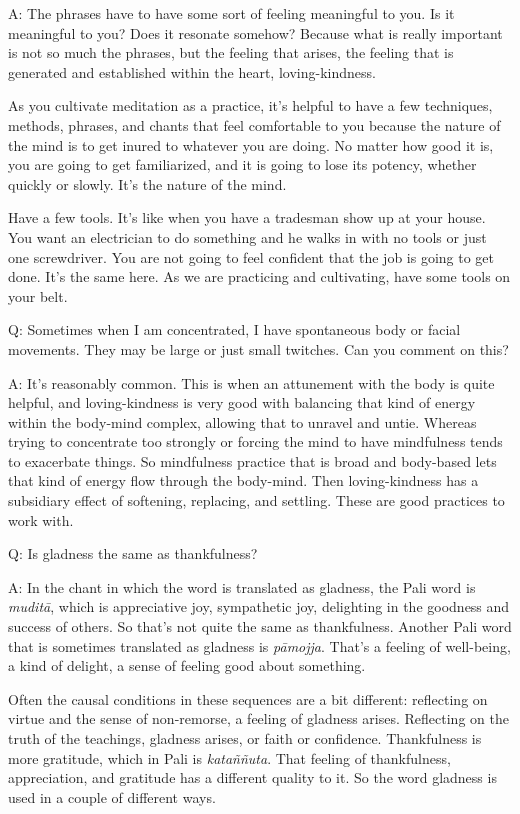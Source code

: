A: The phrases have to have some sort of feeling meaningful to you. Is
it meaningful to you? Does it resonate somehow? Because what is really
important is not so much the phrases, but the feeling that arises, the
feeling that is generated and established within the heart,
loving-kindness.

As you cultivate meditation as a practice, it’s helpful to have a few
techniques, methods, phrases, and chants that feel comfortable to you
because the nature of the mind is to get inured to whatever you are
doing. No matter how good it is, you are going to get familiarized, and
it is going to lose its potency, whether quickly or slowly. It’s the
nature of the mind.

Have a few tools. It’s like when you have a tradesman show up at your
house. You want an electrician to do something and he walks in with no
tools or just one screwdriver. You are not going to feel confident that
the job is going to get done. It’s the same here. As we are practicing
and cultivating, have some tools on your belt.

Q: Sometimes when I am concentrated, I have spontaneous body or facial
movements. They may be large or just small twitches. Can you comment on
this?

A: It’s reasonably common. This is when an attunement with the body is
quite helpful, and loving-kindness is very good with balancing that kind
of energy within the body-mind complex, allowing that to unravel and
untie. Whereas trying to concentrate too strongly or forcing the mind to
have mindfulness tends to exacerbate things. So mindfulness practice
that is broad and body-based lets that kind of energy flow through the
body-mind. Then loving-kindness has a subsidiary effect of softening,
replacing, and settling. These are good practices to work with.

Q: Is gladness the same as thankfulness?

A: In the chant in which the word is translated as gladness, the Pali
word is \emph{muditā}, which is appreciative joy, sympathetic joy,
delighting in the goodness and success of others. So that’s not quite
the same as thankfulness. Another Pali word that is sometimes translated
as gladness is \emph{pāmojja}. That’s a feeling of well-being, a kind of
delight, a sense of feeling good about something.

Often the causal conditions in these sequences are a bit different:
reflecting on virtue and the sense of non-remorse, a feeling of gladness
arises. Reflecting on the truth of the teachings, gladness arises, or
faith or confidence. Thankfulness is more gratitude, which in Pali is
\emph{kataññuta}. That feeling of thankfulness, appreciation, and
gratitude has a different quality to it. So the word gladness is used in
a couple of different ways.

